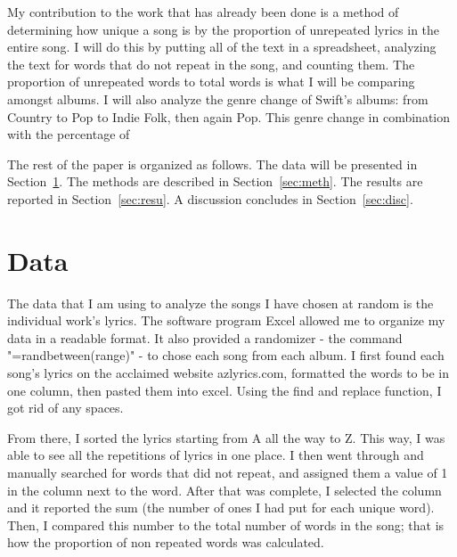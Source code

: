 \documentclass[12pt]{article}
\begin{document}
My contribution to the work that has already been done is a method of determining how unique a song is by the proportion of unrepeated lyrics in the entire song. I will do this by putting all of the text in a spreadsheet, analyzing the text for words that do not repeat in the song, and counting them. The proportion of unrepeated words to total words is what I will be comparing amongst albums.
I will also analyze the genre change of Swift's albums: from Country to Pop to Indie Folk, then again Pop. This genre change in combination with the percentage of 


The rest of the paper is organized as follows.
The data will be presented in Section~\ref{sec:data}.
The methods are described in Section~\ref{sec:meth}.
The results are reported in Section~\ref{sec:resu}.
A discussion concludes in Section~\ref{sec:disc}.


\section{Data}
\label{sec:data}

The data that I am using to analyze the songs I have chosen at random is the individual work's lyrics. The software program Excel allowed me to organize my data in a readable format. It also provided a randomizer - the command "=randbetween(range)" - to chose each song from each album. I first found each song's lyrics on the acclaimed website azlyrics.com, formatted the words to be in one column, then pasted them into excel. Using the find and replace function, I got rid of any spaces. 

From there, I sorted the lyrics starting from A all the way to Z. This way, I was able to see all the repetitions of lyrics in one place. I then went through and manually searched for words that did not repeat, and assigned them a value of 1 in the column next to the word. After that was complete, I selected the column and it reported the sum (the number of ones I had put for each unique word). Then, I compared this number to the total number of words in the song; that is how the proportion of non repeated words was calculated.
\end{document}

